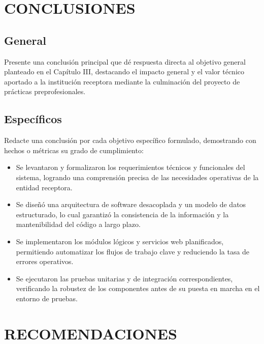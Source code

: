 
\section*{CONCLUSIONES}

\subsection*{General}
Presente una conclusión principal que dé respuesta directa al objetivo general planteado en el Capítulo III, destacando el impacto general y el valor técnico aportado a la institución receptora mediante la culminación del proyecto de prácticas preprofesionales.

\subsection*{Específicos}
Redacte una conclusión por cada objetivo específico formulado, demostrando con hechos o métricas su grado de cumplimiento:
\begin{itemize}
  \item Se levantaron y formalizaron los requerimientos técnicos y funcionales del sistema, logrando una comprensión precisa de las necesidades operativas de la entidad receptora.
  \item Se diseñó una arquitectura de software desacoplada y un modelo de datos estructurado, lo cual garantizó la consistencia de la información y la mantenibilidad del código a largo plazo.
  \item Se implementaron los módulos lógicos y servicios web planificados, permitiendo automatizar los flujos de trabajo clave y reduciendo la tasa de errores operativos.
  \item Se ejecutaron las pruebas unitarias y de integración correspondientes, verificando la robustez de los componentes antes de su puesta en marcha en el entorno de pruebas.
\end{itemize}

\clearpage
\section*{RECOMENDACIONES}

